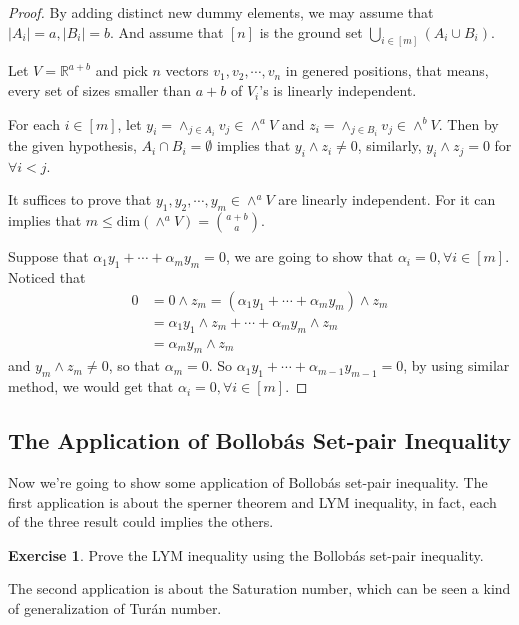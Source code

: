 \documentclass{article}
\theoremstyle{definition}
\newtheorem{exercise}[theorem]{Exercise}
\def\Turan{Tur\'an}
\begin{document}
\begin{proof}
    By adding distinct new dummy elements, we may assume that $\left | A_i \right |= a,\left | B_i \right |= b$. And assume that $\left [n \right ]$ is the ground set $\bigcup_{i \in \left [ m \right ] }(A_i \cup B_i)$.

    Let $V=\mathbb{R} ^{a+b}$ and pick $n$ vectors $v_1,v_2,\cdots,v_n$ in genered positions, that means, every set of sizes smaller than $a+b$ of $V_i$'s is linearly independent.

    For each $i \in \left [ m \right ]$, let $y_i=\wedge _{j \in A_i}v_j \in \wedge ^aV$ and $z_i=\wedge _{j \in B_i}v_j \in \wedge ^bV$. Then by the given hypothesis, $A_i \cap B_i = \emptyset$ implies that $y_i \wedge z_i \neq 0$, similarly, $y_i \wedge z_j=0$ for $\forall i<j$.

    It suffices to prove that $y_1,y_2,\cdots,y_m \in \wedge^aV$ are linearly independent. For it can implies that $m \le \text{dim} (\wedge ^aV)=\binom{a+b}{a}$.

    Suppose that $\alpha_1y_1+\cdots+\alpha_my_m=0$, we are going to show that $\alpha_i=0,\forall i\in \left [ m \right ]$. Noticed that 
\begin{align*}
    0   &=0\wedge z_m=(\alpha _1y_1+\cdots +\alpha_my_m )\wedge z_m\\
        &=\alpha _1y_1\wedge z_m+\cdots+\alpha _my_m\wedge z_m\\
        &=\alpha _my_m\wedge z_m
\end{align*}
    and $y_m\wedge z_m \neq 0$, so that $\alpha_m=0$. So $\alpha_1y_1+\cdots+\alpha_{m-1}y_{m-1}=0$, by using similar method, we would get that $\alpha_i=0,\forall i\in \left [ m \right ]$.
\end{proof}

\subsection{The Application of Bollob\'as Set-pair Inequality}

Now we're going to show some application of Bollob\'as set-pair inequality. The first application is about the sperner theorem and LYM inequality, in fact, each of the three result could implies the others.

\begin{exercise}
    Prove the LYM inequality using the Bollob\'as set-pair inequality.
\end{exercise}

The second application is about the Saturation number, which can be seen a kind of generalization of \Turan{} number. 
\end{document}
